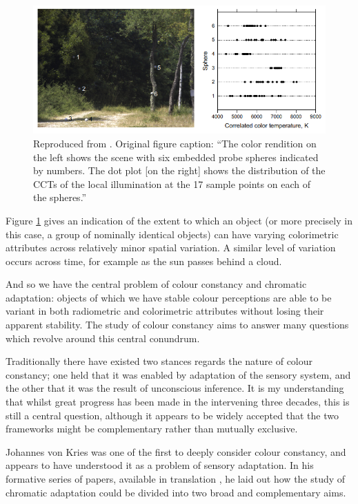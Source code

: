 \begin{figure}[htbp]
\includegraphics[max width=\textwidth]{figs/LitRev/greyballs.png}
\caption{Reproduced from \citet{nascimento_spatial_2014}. Original figure caption: ``The color rendition on the left shows the scene with six embedded probe spheres indicated by numbers. The dot plot [on the right] shows the distribution of the CCTs of the local illumination at the 17 sample points on each of the spheres.''}
\label{fig:greyballs}
\end{figure}

Figure \ref{fig:greyballs} gives an indication of the extent to which an object (or more precisely in this case, a group of nominally identical objects) can have varying colorimetric attributes across relatively minor spatial variation. A similar level of variation occurs across time, for example as the sun passes behind a cloud.

And so we have the central problem of colour constancy and chromatic adaptation: objects of which we have stable colour perceptions are able to be variant in both radiometric and colorimetric attributes without losing their apparent stability. The study of colour constancy aims to answer many questions which revolve around this central conundrum.

Traditionally %
there have existed two stances regards the nature of colour constancy; one held that it was enabled by adaptation of the sensory system, and the other that it was the result of unconscious inference. It is my understanding that whilst great progress has been made in the intervening three decades, this is still a central question, although it appears to be widely accepted that the two frameworks might be complementary rather than mutually exclusive. 

Johannes von Kries was one of the first to deeply consider colour constancy, and appears to have understood it as a problem of sensory adaptation. In his formative series of papers, available in translation \citet{von_kries_beitrag_1970}, he laid out how the study of chromatic adaptation could be divided into two broad and complementary aims. 

